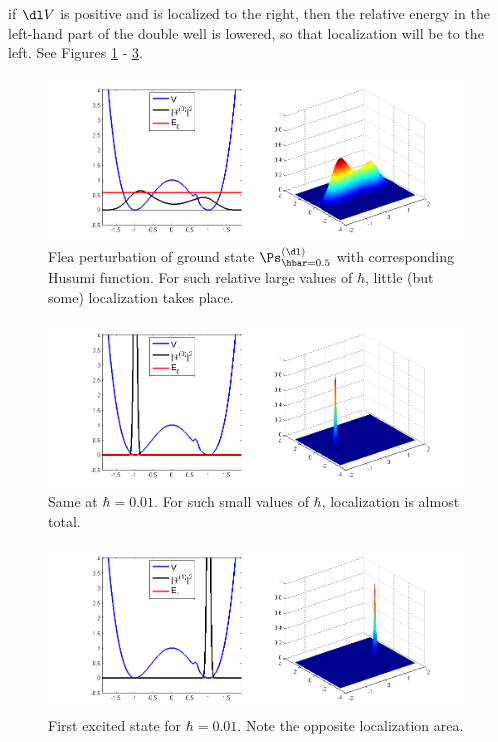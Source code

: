 \documentclass[12pt]{article}
\begin{document}
if $\dl V$ is positive and is localized to the right, then the relative energy in the left-hand part of the double well is lowered, so that localization will be to the left. See Figures \ref{Fleap1} - \ref{Fleap3}.
 \begin{figure}[H]
\begin{center}
\includegraphics[width=0.98\textwidth]{KL2,hbar=0,5.png}
\caption{Flea perturbation of ground state $\Ps_{\hbar=0.5}^{(\dl)}$ with corresponding Husumi function. For such relative large values of $\hbar$, little (but some) localization takes place.}
\label{Fleap1}
\end{center}
\end{figure}\vspace*{-5mm}
\begin{figure}[H]
\begin{center}
\includegraphics[width=0.98\textwidth]{KL2,hbar=0,01-2.png}
\caption{Same at $\hbar=0.01$. For such small values of $\hbar$, localization is  almost total.}
\label{Fleap2}
\end{center}
\end{figure}\vspace*{-5mm}
\begin{figure}[H]
\begin{center}
\includegraphics[width=0.98\textwidth]{KL2,hbar=0,01-1-1.png}
\caption{First excited state for $\hbar=0.01$. Note the opposite localization area.}
\label{Fleap3}
\end{center}
\end{figure}
\end{document}

